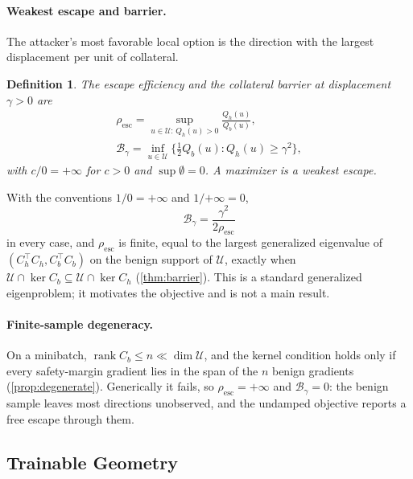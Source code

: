 \documentclass[11pt]{article}
\newtheorem{definition}{Definition}
\newcommand{\Resc}{\rho_{\mathrm{esc}}}
\newcommand{\Barrier}{\mathcal{B}}
\newcommand{\U}{\mathcal{U}}
\newcommand{\Ch}{C_{h}}
\newcommand{\Cb}{C_{b}}
\begin{document}
\paragraph{Weakest escape and barrier.}
The attacker's most favorable local option is the direction with the largest displacement per unit of collateral.
\begin{definition}
\label{def:escape}
The \emph{escape efficiency} and the \emph{collateral barrier} at displacement $\gamma>0$ are
\begin{equation}
\begin{gathered}
\Resc=\sup_{u\in\U:\,Q_h(u)>0}\frac{Q_h(u)}{Q_b(u)},\\
\Barrier_\gamma=\inf_{u\in\U}\bigl\{\tfrac12Q_b(u):Q_h(u)\ge\gamma^2\bigr\},
\end{gathered}
\label{eq:rho_esc}
\end{equation}
with $c/0=+\infty$ for $c>0$ and $\sup\emptyset=0$. A maximizer is a \emph{weakest escape}.
\end{definition}
With the conventions $1/0=+\infty$ and $1/{+\infty}=0$,
\begin{equation}
\Barrier_\gamma=\frac{\gamma^2}{2\Resc}
\label{eq:barrier_identity}
\end{equation}
in every case, and $\Resc$ is finite, equal to the largest generalized eigenvalue of $(\Ch^\top\Ch,\Cb^\top\Cb)$ on the benign support of $\U$, exactly when $\U\cap\ker\Cb\subseteq\U\cap\ker\Ch$ (\cref{thm:barrier}). This is a standard generalized eigenproblem; it motivates the objective and is not a main result.

\paragraph{Finite-sample degeneracy.}
On a minibatch, $\operatorname{rank}\Cb\le n\ll\dim\U$, and the kernel condition holds only if every safety-margin gradient lies in the span of the $n$ benign gradients (\cref{prop:degenerate}). Generically it fails, so $\Resc=+\infty$ and $\Barrier_\gamma=0$: the benign sample leaves most directions unobserved, and the undamped objective reports a free escape through them.



\subsection{Trainable Geometry}
\label{sec:practical}
\end{document}
